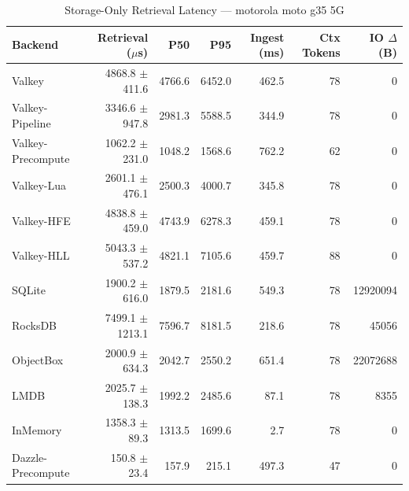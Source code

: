\begin{table}[ht]
\centering
\caption{Storage-Only Retrieval Latency — motorola moto g35 5G}
\label{tab:storage-only}
\begin{tabular}{lrrrrrr}
\toprule
Backend & Retrieval ($\mu$s) & P50 & P95 & Ingest (ms) & Ctx Tokens & IO $\Delta$ (B) \\
\midrule
  Valkey & 4868.8 $\pm$ 411.6 & 4766.6 & 6452.0 & 462.5 & 78 & 0 \\
  Valkey-Pipeline & 3346.6 $\pm$ 947.8 & 2981.3 & 5588.5 & 344.9 & 78 & 0 \\
  Valkey-Precompute & 1062.2 $\pm$ 231.0 & 1048.2 & 1568.6 & 762.2 & 62 & 0 \\
  Valkey-Lua & 2601.1 $\pm$ 476.1 & 2500.3 & 4000.7 & 345.8 & 78 & 0 \\
  Valkey-HFE & 4838.8 $\pm$ 459.0 & 4743.9 & 6278.3 & 459.1 & 78 & 0 \\
  Valkey-HLL & 5043.3 $\pm$ 537.2 & 4821.1 & 7105.6 & 459.7 & 88 & 0 \\
  SQLite & 1900.2 $\pm$ 616.0 & 1879.5 & 2181.6 & 549.3 & 78 & 12920094 \\
  RocksDB & 7499.1 $\pm$ 1213.1 & 7596.7 & 8181.5 & 218.6 & 78 & 45056 \\
  ObjectBox & 2000.9 $\pm$ 634.3 & 2042.7 & 2550.2 & 651.4 & 78 & 22072688 \\
  LMDB & 2025.7 $\pm$ 138.3 & 1992.2 & 2485.6 & 87.1 & 78 & 8355 \\
  InMemory & 1358.3 $\pm$ 89.3 & 1313.5 & 1699.6 & 2.7 & 78 & 0 \\
  Dazzle-Precompute & 150.8 $\pm$ 23.4 & 157.9 & 215.1 & 497.3 & 47 & 0 \\
\bottomrule
\end{tabular}
\end{table}
